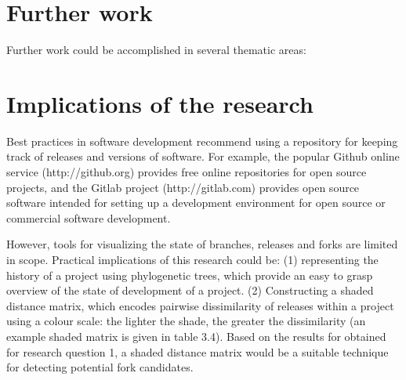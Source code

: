 \section{Further work}
Further work could be accomplished in several thematic areas:

\begin{description}


\end{description}

\section{Implications of the research}
Best practices in software development recommend using a repository for keeping track of releases and versions of software. For example, the popular Github online service (http://github.org) provides free online repositories for open source projects, and the Gitlab project (http://gitlab.com) provides open source software intended for setting up a development environment for open source or commercial software development. 

However, tools for visualizing the state of branches, releases and forks are limited in scope. Practical implications of this research could be: (1) representing the history of a project using phylogenetic trees, which provide an easy to grasp overview of the state of development of a project. (2) Constructing a shaded distance matrix, which encodes pairwise dissimilarity of releases within a project using a colour scale: the lighter the shade, the greater the dissimilarity (an example shaded matrix is given in table 3.4). Based on the results for obtained for research question 1, a shaded distance matrix would be a suitable technique for detecting potential fork candidates. 

